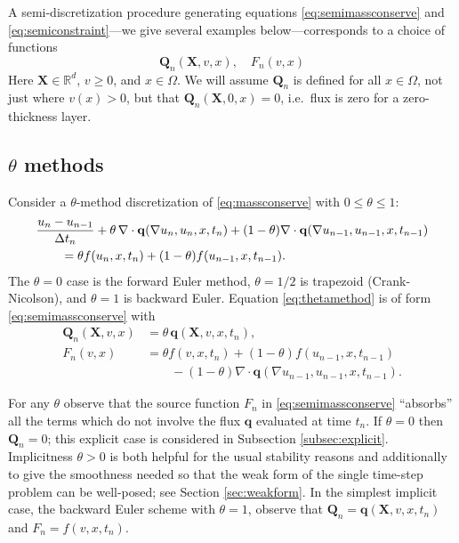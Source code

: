 \documentclass[final,onefignum]{siamart190516}
\newcommand\bq{\mathbf{q}}
\newcommand\bQ{\mathbf{Q}}
\newcommand\bX{\mathbf{X}}
\newcommand{\Div}{\nabla\cdot}
\newcommand{\grad}{\nabla}
\newcommand\RR{\mathbb{R}}
\begin{document}
A semi-discretization procedure generating equations \eqref{eq:semimassconserve} and \eqref{eq:semiconstraint}---we give several examples below---corresponds to a choice of functions
\begin{equation}
\bQ_n(\bX,v,x), \quad F_n(v,x) \label{eq:functionalforms}
\end{equation}
Here $\bX\in\RR^d$, $v\ge 0$, and $x\in \Omega$.  We will assume $\bQ_n$ is defined for all $x\in\Omega$, not just where $v(x)>0$, but that $\bQ_n(\bX,0,x)=0$, i.e.~flux is zero for a zero-thickness layer.

\subsection{$\theta$ methods}  \label{subsec:thetamethods}  Consider a $\theta$-method discretization \cite{MortonMayers2005} of \eqref{eq:massconserve} with $0\le \theta \le 1$:
\begin{align}
  &\frac{u_n - u_{n-1}}{\Delta t_n} + \theta\, \Div \bq(\grad u_n,u_n,x,t_n) + (1-\theta) \Div \bq(\grad u_{n-1},u_{n-1},x,t_{n-1}) \label{eq:thetamethod} \\
  &\qquad =  \theta f(u_n,x,t_n) + (1-\theta) f(u_{n-1},x,t_{n-1}). \notag
\end{align}
The $\theta=0$ case is the forward Euler method, $\theta=1/2$ is trapezoid (Crank-Nicolson), and $\theta=1$ is backward Euler.  Equation \eqref{eq:thetamethod} is of form \eqref{eq:semimassconserve} with
\begin{align*}
\bQ_n(\bX,v,x) &= \theta\, \bq(\bX,v,x,t_n), \\
F_n(v,x)       &= \theta f(v,x,t_n) + (1-\theta) f(u_{n-1},x,t_{n-1}) \\
               &\qquad - (1-\theta) \Div \bq(\grad u_{n-1},u_{n-1},x,t_{n-1}).
\end{align*}

For any $\theta$ observe that the source function $F_n$ in \eqref{eq:semimassconserve} ``absorbs'' all the terms which do not involve the flux $\bq$ evaluated at time $t_n$.  If $\theta=0$ then $\bQ_n=0$; this explicit case is considered in Subsection \ref{subsec:explicit}.  Implicitness $\theta>0$ is both helpful for the usual stability reasons \cite{MortonMayers2005} and additionally to give the smoothness needed so that the weak form of the single time-step problem can be well-posed; see Section \ref{sec:weakform}.  In the simplest implicit case, the backward Euler scheme with $\theta=1$, observe that $\bQ_n = \bq(\bX,v,x,t_n)$ and $F_n = f(v,x,t_n)$.
\end{document}
